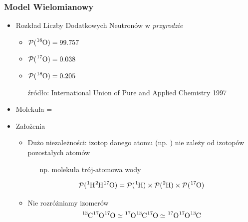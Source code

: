 \documentclass[xetex]{beamer}
\begin{document}
	\begin{frame}\frametitle{Model Wielomianowy}

		\begin{itemize}
			\item Rozkład Liczby Dodatkowych Neutronów w {\it przyrodzie}
			\begin{itemize}
				\item $\prob( \cem{^{16}O} ) = 99.757$
				\item $\prob( \cem{^{17}O} ) = 0.038$
				\item $\prob( \cem{^{18}O} ) = 0.205$
				\item[źródło:] \textcolor{adriatico}{I}nternational \textcolor{adriatico}{U}nion of \textcolor{adriatico}{P}ure and \textcolor{adriatico}{A}pplied \textcolor{adriatico}{C}hemistry 1997 
			\end{itemize}
			\item Molekuła = \molecule
			\item Założenia
			\begin{itemize}
				\item 	Dużo niezależności: izotop danego atomu \molecule (np. ) nie zależy od izotopów pozostałych atomów
				\begin{itemize}
					\item[np.]  molekuła trój-atomowa wody
				\end{itemize}				  
				$$\prob( \cem{^{1}H ^{2}H ^{17}O} ) = 
					\prob( \cem{^{1}H} ) \times \prob( \cem{^{2}H} ) \times \prob( \cem{ ^{17}O} ) $$
				\item 	Nie rozróżniamy izomerów
				$$ \cem{^{13}C ^{17}O ^{17}O} \simeq \cem{^{17}O ^{13}C ^{17}O} \simeq \cem{ ^{17}O ^{17}O ^{13}C }$$	
			\end{itemize}
		\end{itemize}

	\end{frame}
\end{document}
